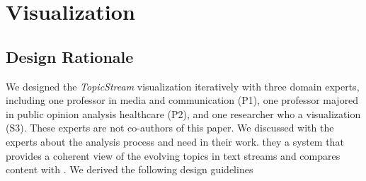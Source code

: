 
\section{Visualization}
\label{sec:vis}



\subsection{Design Rationale}
\label{sec:rationale}
We designed the \emph{\normalsize TopicStream} visualization iteratively with three domain experts, including one professor in media and communication (P1), one professor  majored in public opinion analysis  healthcare (P2), and one researcher who  a visualization  (S3).
These experts are not co-authors of this paper.
We discussed with the experts about the analysis process and need in their work.
 they  a system that provides a coherent view of the evolving topics in text streams and compares  content with  .
We derived the following design guidelines 

